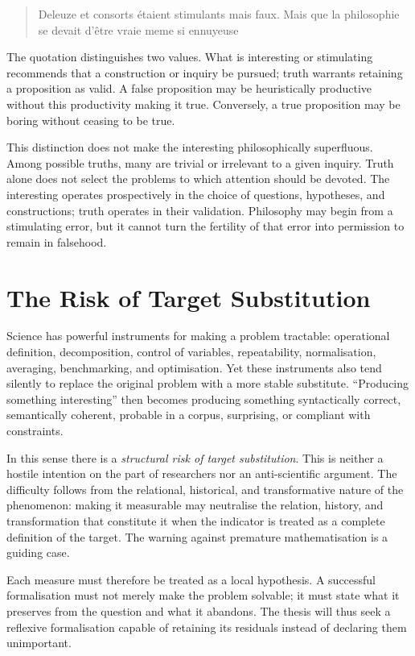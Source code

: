 \documentclass[11pt,a4paper]{article}
\begin{document}
\begin{quote}
Deleuze et consorts étaient stimulants mais faux. Mais que la philosophie se
devait d'être vraie meme si ennuyeuse
\end{quote}

The quotation distinguishes two values. What is interesting or stimulating
recommends that a construction or inquiry be pursued; truth warrants retaining
a proposition as valid. A false proposition may be heuristically productive
without this productivity making it true. Conversely, a true proposition may
be boring without ceasing to be true.

This distinction does not make the interesting philosophically superfluous.
Among possible truths, many are trivial or irrelevant to a given inquiry. Truth
alone does not select the problems to which attention should be devoted. The
interesting operates prospectively in the choice of questions, hypotheses, and
constructions; truth operates in their validation. Philosophy may begin from a
stimulating error, but it cannot turn the fertility of that error into
permission to remain in falsehood.

\section{The Risk of Target Substitution}

Science has powerful instruments for making a problem tractable: operational
definition, decomposition, control of variables, repeatability, normalisation,
averaging, benchmarking, and optimisation. Yet these instruments also tend
silently to replace the original problem with a more stable substitute.
``Producing something interesting'' then becomes producing something
syntactically correct, semantically coherent, probable in a corpus, surprising,
or compliant with constraints.

In this sense there is a \emph{structural risk of target substitution}. This is
neither a hostile intention on the part of researchers nor an anti-scientific
argument. The difficulty follows from the relational, historical, and
transformative nature of the phenomenon: making it measurable may neutralise
the relation, history, and transformation that constitute it when the indicator
is treated as a complete definition of the target. The warning against premature
mathematisation
\parencite{russell1995rationality,russell1995awardlecture} is a guiding case.

Each measure must therefore be treated as a local hypothesis. A successful
formalisation must not merely make the problem solvable; it must state what it
preserves from the question and what it abandons. The thesis will thus seek a
reflexive formalisation capable of retaining its residuals instead of declaring
them unimportant.
\end{document}
